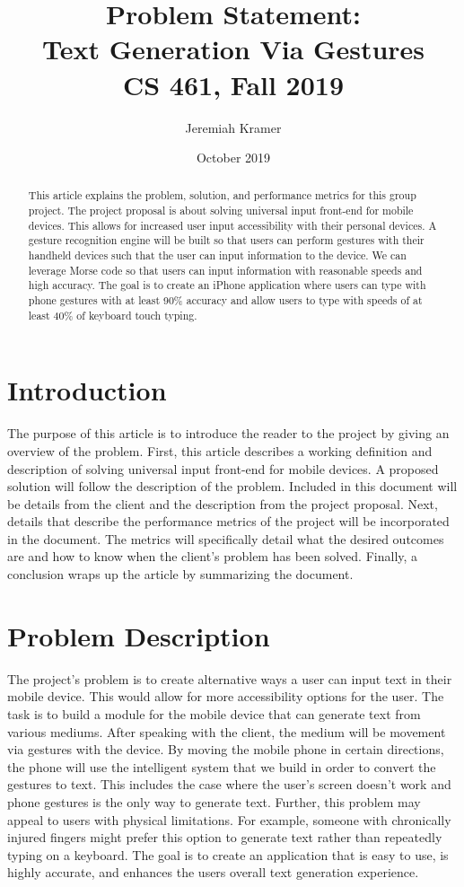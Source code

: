 \documentclass[draftclsnofoot,onecolumn]{iEEEtran}
\title{Problem Statement: \\Text Generation Via Gestures\\{\large CS 461, Fall 2019}}
\author{Jeremiah Kramer}
\date{October 2019}
\begin{document}
\maketitle
{}
\begin{abstract}
This article explains the problem, solution, and performance metrics for this group project. The project proposal is about solving universal input front-end for mobile devices. This allows for increased user input accessibility with their personal devices. A gesture recognition engine will be built so that users can perform gestures with their handheld devices such that the user can input information to the device. We can leverage Morse code so that users can input information with reasonable speeds and high accuracy. The goal is to create an iPhone application where users can type with phone gestures with at least 90\% accuracy and allow users to type with speeds of at least 40\% of keyboard touch typing.
\end{abstract}
\newpage
\section{Introduction}
\IEEEPARstart{}{}The purpose of this article is to introduce the reader to the project by giving an overview of the problem. First, this article describes a working definition and description of solving universal input front-end for mobile devices. A proposed solution will follow the description of the problem. Included in this document will be details from the client and the description from the project proposal. Next, details that describe the performance metrics of the project will be incorporated in the document. The metrics will specifically detail what the desired outcomes are and how to know when the client's problem has been solved. Finally, a conclusion wraps up the article by summarizing the document.
\section{Problem Description}
\IEEEPARstart{}{}The project’s problem is to create alternative ways a user can input text in their mobile device. This would allow for more accessibility options for the user. The task is to build a module for the mobile device that can generate text from various mediums. After speaking with the client, the medium will be movement via gestures with the device. By moving the mobile phone in certain directions, the phone will use the intelligent system that we build in order to convert the gestures to text. This includes the case where the user’s screen doesn’t work and phone gestures is the only way to generate text. Further, this problem may appeal to users with physical limitations. For example, someone with chronically injured fingers might prefer this option to generate text rather than repeatedly typing on a keyboard. The goal is to create an application that is easy to use, is highly accurate, and enhances the users overall text generation experience.
\end{document}
